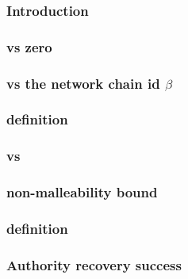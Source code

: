 \subsubsection{Introduction                                     \lispTodo{}} \label{rlp auth: comparisons: validity: intro}                                 
\subsubsection{\locChainId{} vs zero                            \lispTodo{}} \label{rlp auth: comparisons: validity: chain id iszero}                       
\subsubsection{\locChainId{} vs the network chain id $\beta$    \lispTodo{}} \label{rlp auth: comparisons: validity: chain id vs network chain id}          
\subsubsection{\locChainIdIsZeroOrBeta{} definition             \lispTodo{}} \label{rlp auth: comparisons: validity: defining chain id is 0 or beta}        
\subsubsection{\locNonce{} vs \maxNonce{}                       \lispTodo{}} \label{rlp auth: comparisons: validity: nonce EIP 2681 bound}                  
\subsubsection{\locSignatureS{} non-malleability bound          \lispTodo{}} \label{rlp auth: comparisons: validity: signature s non malleability}          
\subsubsection{\locCallEcrecoverExpression{} definition         \lispTodo{}} \label{rlp auth: comparisons: validity: defining call ecrecover expression}    
\subsubsection{Authority recovery success                       \lispTodo{}} \label{rlp auth: comparisons: validity: authority recovery success}            
